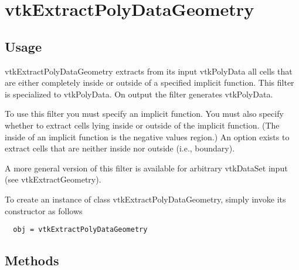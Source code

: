 \section{vtkExtractPolyDataGeometry}

\subsection{Usage}

 vtkExtractPolyDataGeometry extracts from its input vtkPolyData all cells
 that are either completely inside or outside of a specified implicit
 function. This filter is specialized to vtkPolyData. On output the 
 filter generates vtkPolyData.

 To use this filter you must specify an implicit function. You must also
 specify whether to extract cells lying inside or outside of the implicit 
 function. (The inside of an implicit function is the negative values 
 region.) An option exists to extract cells that are neither inside nor
 outside (i.e., boundary).

 A more general version of this filter is available for arbitrary
 vtkDataSet input (see vtkExtractGeometry).

To create an instance of class vtkExtractPolyDataGeometry, simply
invoke its constructor as follows
\begin{verbatim}
  obj = vtkExtractPolyDataGeometry
\end{verbatim}
\subsection{Methods}

